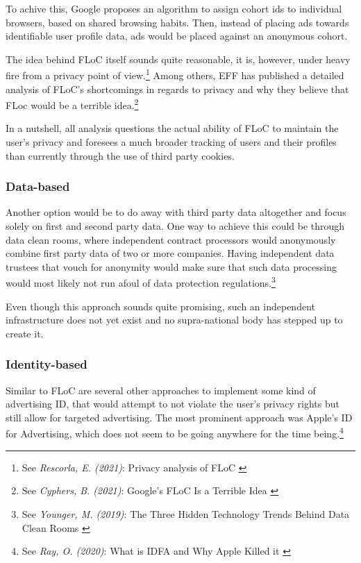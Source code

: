 To achive this, Google proposes an algorithm to assign cohort ids to individual browsers, based on shared browsing habits. Then, instead of placing ads towards identifiable user profile data, ads would be placed against an anonymous cohort. 

The idea behind FLoC itself sounds quite reasonable, it is, however, under heavy fire from a privacy point of view.\footnote{See \textit{Rescorla, E. (2021)}: Privacy analysis of FLoC \cite{privacyFloc}} Among others, EFF has published a detailed analysis of FLoC's shortcomings in regards to privacy and why they believe that FLoc would be a terrible idea.\footnote{See \textit{Cyphers, B. (2021)}: Google’s FLoC Is a Terrible Idea \cite{terribleIdea}}

In a nutshell, all analysis questions the actual ability of FLoC to maintain the user's privacy and foresees a much broader tracking of users and their profiles than currently through the use of third party cookies.

\subsubsection{Data-based}

Another option would be to do away with third party data altogether and focus solely on first and second party data. One way to achieve this could be through data clean rooms, where independent contract processors would anonymously combine first party data of two or more companies. Having independent data trustees that vouch for anonymity would make sure that such data processing would most likely not run afoul of data protection regulations.\footnote{See \textit{Younger, M. (2019)}: The Three Hidden Technology Trends Behind Data Clean Rooms \cite{cleanRoom}}

Even though this approach sounds quite promising, such an independent infrastructure does not yet exist and no supra-national body has stepped up to create it.

\subsubsection{Identity-based}

Similar to FLoC are several other approaches to implement some kind of advertising ID, that would attempt to not violate the user's privacy rights but still allow for targeted advertising. The most prominent approach was Apple's ID for Advertising, which does not seem to be going anywhere for the time being.\footnote{See \textit{Ray, O. (2020)}: What is IDFA and Why Apple Killed it \cite{cleanRoom}}

